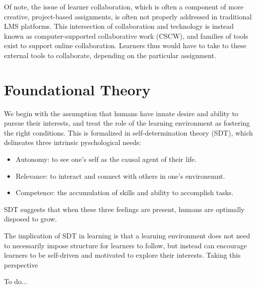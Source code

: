 \documentclass[12pt,twoside,vi]{mitthesis}
\newcommand{\wip}[1]{{\color{red} To do...}}
\begin{document}
Of note, the issue of learner collaboration, which is often a component of more creative, project-based assignments, is often not properly addressed in traditional LMS platforms. This intersection of collaboration and technology is instead known as computer-supported collaborative work (CSCW), and families of tools exist to support online collaboration. Learners thus would have to take to these external tools to collaborate, depending on the particular assignment.

\section{Foundational Theory}

We begin with the assumption that humans have innate desire and ability to pursue their interests, and treat the role of the learning environment as fostering the right conditions. This is formalized in self-determination theory (SDT), which delineates three intrinsic pyschological needs:
\begin{itemize}
\item Autonomy: to see one's self as the causal agent of their life.
\item Relevance: to interact and connect with others in one's environemnt.
\item Competence: the accumulation of skills and ability to accomplish tasks.
\end{itemize}
SDT suggests that when these three feelings are present, humans are optimally disposed to grow.~\cite{ryan2000self}\cite{selfdetermination}\cite{selfdetermination2}

The implication of SDT in learning is that a learning environment does not need to necessarily impose structure for learners to follow, but instead can encourage learners to be self-driven and motivated to explore their interests. Taking this perspective \cite{niemiec2009autonomy}



\wip{Assuming SDT (autonomy, relevance, competence), which explains why humans have an innate desire to do things and have individualized passions, we use the 4P's to achieve learning outcomes (reason ------ design ----, work collaboratively.... mitch reference)

We had several goals in mind when deciding how to craft the online course, which can be summarized in four principles: 
Projects. 
Peers. 
Passion. 
Play. 
We believe learners do best when they are engaged in th

These principles largely rely on students being drivers of their own learning. 

We turn to self-determination theory (SDT) as a model with which to understand learners' motivation. SDT [citation needed]

Self-determination theory: autonomy, competence, relatedness. Hence, we prioritize these in designing features of the platform.
}
\end{document}
